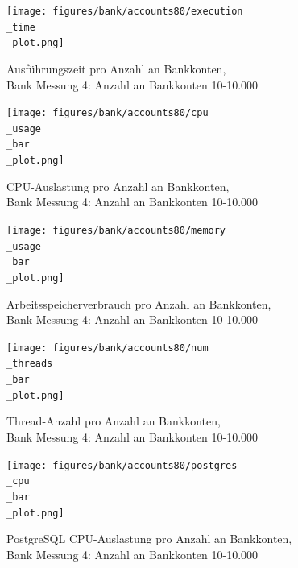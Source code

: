 \documentclass[fontsize=12pt,paper=a4,twoside=semi,parskip=half-,headsepline,headinclude]{scrreprt}
\begin{document}
\begin{figure}[H]
	\centering
	\texttt{[image: figures/bank/accounts80/execution\\\_time\\\_plot.png]}
	\caption{Ausführungszeit pro Anzahl an Bankkonten,\\ Bank Messung 4: Anzahl an Bankkonten 10-10.000}
	\label{fig:bankAccounts80Zeit}
\end{figure}

\begin{figure}[H]
	\centering
	\texttt{[image: figures/bank/accounts80/cpu\\\_usage\\\_bar\\\_plot.png]}
	\caption{CPU-Auslastung pro Anzahl an Bankkonten,\\ Bank Messung 4: Anzahl an Bankkonten 10-10.000}
	\label{fig:bankAccounts80CPU}
\end{figure}

\begin{figure}[H]
	\centering
	\texttt{[image: figures/bank/accounts80/memory\\\_usage\\\_bar\\\_plot.png]}
	\caption{Arbeitsspeicherverbrauch pro Anzahl an Bankkonten,\\ Bank Messung 4: Anzahl an Bankkonten 10-10.000}
	\label{fig:bankAccounts80RAM}
\end{figure}

\begin{figure}[H]
	\centering
	\texttt{[image: figures/bank/accounts80/num\\\_threads\\\_bar\\\_plot.png]}
	\caption{Thread-Anzahl pro Anzahl an Bankkonten,\\ Bank Messung 4: Anzahl an Bankkonten 10-10.000}
	\label{fig:bankAccounts80Threads}
\end{figure}

\begin{figure}[H]
	\centering
	\texttt{[image: figures/bank/accounts80/postgres\\\_cpu\\\_bar\\\_plot.png]}
	\caption{PostgreSQL CPU-Auslastung pro Anzahl an Bankkonten,\\ Bank Messung 4: Anzahl an Bankkonten 10-10.000}
	\label{fig:bankAccounts80PostgCPU}
\end{figure}
\end{document}
